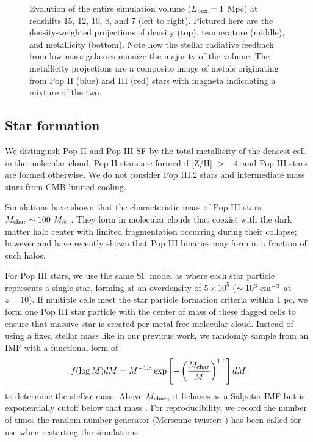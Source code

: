 \documentclass[apjl]{emulateapj}
\begin{document}

\begin{figure*}
  \caption{\label{fig:evo-mosaic} Evolution of the entire simulation
    volume ($L_{\rm box} = 1$ Mpc) at redshifts 15, 12, 10, 8, and 7
    (left to right).  Pictured here are the density-weighted
    projections of density (top), temperature (middle), and
    metallicity (bottom).  Note how the stellar radiative feedback
    from low-mass galaxies reionize the majority of the volume.  The
    metallicity projections are a composite image of metals
    originating from Pop II (blue) and III (red) stars with magneta
    indicdating a mixture of the two.}
\end{figure*}


\subsection{Star formation}

We distinguish Pop II and Pop III SF by the total metallicity of the
densest cell in the molecular cloud.  Pop II stars are formed if [Z/H]
$> -4$, and Pop III stars are formed otherwise.  We do not consider
Pop III.2 stars and intermediate mass stars from CMB-limited cooling.

Simulations have shown that the characteristic mass of Pop III stars
$M_{\rm char} \sim 100~\Ms$ \citep{ABN02, Bromm02_P3, OShea07a}.  They
form in molecular clouds that coexist with the dark matter halo center
with limited fragmentation occurring during their collapse; however
\citet{2009Sci...325..601T} and \citet{Stacy10_Binary} have recently
shown that Pop III binaries may form in a fraction of such halos.


For Pop III stars, we use the same SF model as \citet{Wise08_Gal}
where each star particle represents a single star, forming at an
overdensity of $5 \times 10^5$ ($\sim 10^3\; \cubecm$ at $z=10$).  If
multiple cells meet the star particle formation criteria within 1 pc,
we form one Pop III star particle with the center of mass of these
flagged cells to ensure that massive star is created per metal-free
molecular cloud.  Instead of using a fixed stellar mass like in our
previous work, we randomly sample from an IMF with a functional form
of
%
\begin{equation}
\label{eqn:imf}
f(\log M) dM = M^{-1.3} \exp\left[-\left(\frac{M_{\rm
      char}}{M}\right)^{1.6}\right] dM
\end{equation}
to determine the stellar mass.  Above $M_{\rm char}$, it behaves as a
Salpeter IMF but is exponentially cutoff below that mass
\citep{Chabrier03, Clark09}.  For reproducibility, we record the number
of times the random number generator (Mersenne twister;
\citet{MTwister}) has been called for use when restarting the
simulations.
\end{document}
